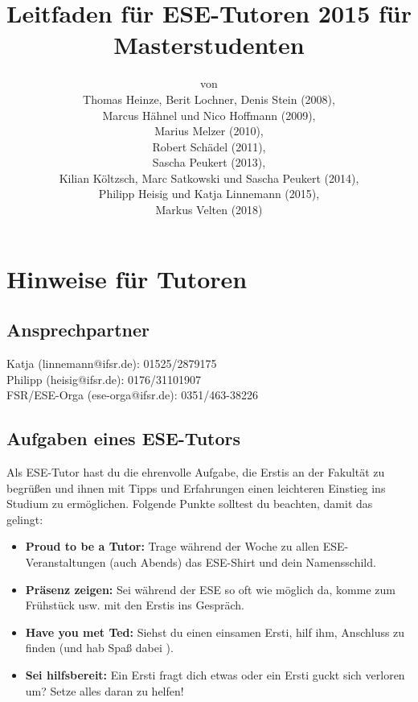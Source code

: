 \documentclass[a4paper,12pt]{report}
\begin{document}
\title{\textbf{Leitfaden für ESE-Tutoren 2015 für Masterstudenten}\\}
\date{}
\author{von\\Thomas Heinze, Berit Lochner, Denis Stein (2008), \\Marcus Hähnel und Nico Hoffmann (2009), \\Marius Melzer (2010), \\Robert Schädel (2011),\\Sascha Peukert (2013), \\Kilian Költzsch, Marc Satkowski und Sascha Peukert (2014), \\Philipp Heisig und Katja Linnemann (2015), \\Markus Velten (2018)}
\maketitle
\tableofcontents
\chapter{Hinweise für Tutoren}
\section{Ansprechpartner}
Katja (linnemann@ifsr.de): 01525/2879175\\
Philipp (heisig@ifsr.de): 0176/31101907 \\
FSR/ESE-Orga (ese-orga@ifsr.de): 0351/463-38226

\section{Aufgaben eines ESE-Tutors}
Als ESE-Tutor hast du die ehrenvolle Aufgabe, die Erstis an der Fakultät zu begrüßen und ihnen mit Tipps und Erfahrungen einen leichteren Einstieg ins Studium zu ermöglichen. Folgende Punkte solltest du beachten, damit das gelingt:
\begin{itemize}
	\item \textbf{Proud to be a Tutor:} Trage während der Woche zu allen ESE-Veranstaltungen (auch Abends) das ESE-Shirt und dein Namensschild.
	\item \textbf{Präsenz zeigen:} Sei während der ESE so oft wie möglich da, komme zum Frühstück usw. mit den Erstis ins Gespräch.
	\item \textbf{Have you met Ted:} Siehst du einen einsamen Ersti, hilf ihm, Anschluss zu finden (und hab Spaß dabei \Winkey ).
	\item \textbf{Sei hilfsbereit:} Ein Ersti fragt dich etwas oder ein Ersti guckt sich verloren um? Setze alles daran zu helfen!
\end{itemize}
\end{document}
